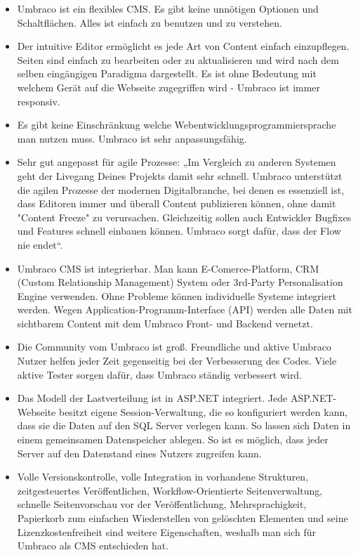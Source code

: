 \begin{itemize}	
	\item Umbraco ist ein flexibles CMS. Es gibt keine unnötigen Optionen und Schaltflächen. Alles ist einfach zu benutzen und zu verstehen.
	\item Der intuitive Editor ermöglicht es jede Art von Content einfach einzupflegen. Seiten sind einfach zu bearbeiten oder zu aktualisieren und wird  nach dem selben eingängigen Paradigma dargestellt. Es ist ohne Bedeutung mit welchem Gerät auf die Webseite zugegriffen wird - Umbraco ist immer responsiv. 
	\item Es gibt keine Einschränkung welche Webentwicklungsprogrammiersprache man nutzen muss. Umbraco ist sehr anpassungsfähig. 
	\item Sehr gut angepasst für agile Prozesse: „Im Vergleich zu anderen Systemen geht der Livegang Deines Projekts damit sehr schnell. Umbraco unterstützt die agilen Prozesse der modernen Digitalbranche, bei denen es essenziell ist, dass Editoren immer und überall Content publizieren können, ohne damit "Content Freeze" zu verursachen. Gleichzeitig sollen auch Entwickler Bugfixes und Features schnell einbauen können. Umbraco sorgt dafür, dass der Flow nie endet“. 
	\item Umbraco CMS ist integrierbar. Man kann E-Comerce-Platform, CRM (Custom Relationship Management) System oder 3rd-Party Personalisation Engine verwenden. Ohne Probleme können individuelle Systeme integriert werden. Wegen Application-Programm-Interface (API) werden alle Daten mit sichtbarem Content mit dem Umbraco Front- und Backend vernetzt.
	\item Die Community vom Umbraco ist groß. Freundliche und aktive Umbraco Nutzer helfen jeder Zeit  gegenseitig bei der Verbesserung des Codes. Viele aktive Tester sorgen dafür, dass Umbraco ständig verbessert wird.
	\item Das Modell der Lastverteilung ist in ASP.NET integriert. Jede ASP.NET-Webseite besitzt eigene Session-Verwaltung, die so konfiguriert werden kann, dass sie die Daten auf den SQL Server verlegen kann. So lassen sich Daten in einem gemeinsamen Datenspeicher ablegen. So ist es möglich, dass jeder Server auf den Datenstand eines Nutzers zugreifen kann.
	\item Volle Versionskontrolle, volle Integration in vorhandene Strukturen, zeitgesteuertes Veröffentlichen, Workflow-Orientierte Seitenverwaltung, schnelle Seitenvorschau vor der Veröffentlichung, Mehrsprachigkeit, Papierkorb zum einfachen Wiederstellen von gelöschten Elementen und seine Lizenzkostenfreiheit sind weitere Eigenschaften, weshalb man sich für Umbraco als CMS entschieden hat.
\end{itemize}
	

